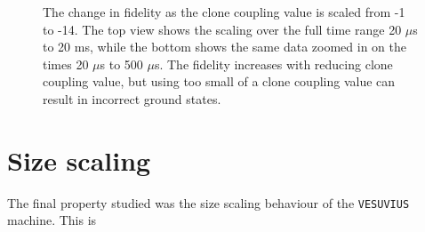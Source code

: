 \begin{figure}
	\caption[Variable Clone Coupling Fidelity]{The change in fidelity as the clone coupling value is scaled from -1 to -14.  The top view shows the scaling over the full time range 20 $\mu$s to 20 ms, while the bottom shows the same data zoomed in on the times 20 $\mu$s to 500 $\mu$s.  The fidelity increases with reducing clone coupling value, but using too small of a clone coupling value can result in incorrect ground states.}
	\label{fig:clone_coupling}
\end{figure}

\section{Size scaling}
The final property studied was the size scaling behaviour of the \texttt{VESUVIUS} machine.  This is 
